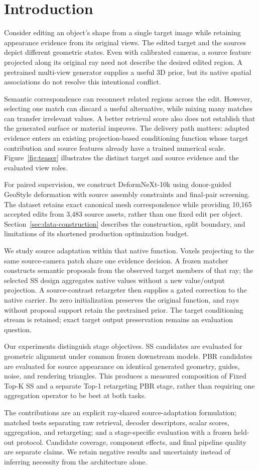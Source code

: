 \section{Introduction}
Consider editing an object's shape from a single target image while retaining
appearance evidence from its original views. The edited target and the
sources depict different geometric states. Even with calibrated cameras, a
source feature projected along its original ray need not describe the desired
edited region. A pretrained multi-view generator supplies a useful 3D prior,
but its native spatial associations do not resolve this intentional conflict.

Semantic correspondence can reconnect related regions across the edit.
However, selecting one match can discard a useful alternative, while mixing
many matches can transfer irrelevant values. A better retrieval score also
does not establish that the generated surface or material improves. The
delivery path matters: adapted evidence enters an existing projection-based
conditioning function whose target contribution and source features already
have a trained numerical scale.
Figure~\ref{fig:teaser} illustrates the distinct target and source evidence
and the evaluated view roles.

For paired supervision, we construct DeformNeXt-10k using donor-guided
GeoStyle deformation with source assembly constraints and final-pair
screening. The dataset retains exact canonical mesh correspondence while
providing 10,165 accepted edits from 3,483 source assets, rather than one
fixed edit per object. Section~\ref{sec:data-construction} describes the
construction, split boundary, and limitations of its shortened production
optimization budget.

We study source adaptation within that native function. Voxels projecting to
the same source-camera patch share one evidence decision. A frozen matcher
constructs semantic proposals from the observed target members of that ray;
the selected SS design aggregates native values without a new value/output
projection. A source-contrast retargeter then supplies a gated correction to
the native carrier. Its zero initialization preserves the original function,
and rays without proposal support retain the pretrained prior. The target
conditioning stream is retained; exact target output preservation remains
an evaluation question.

Our experiments distinguish stage objectives. SS candidates are evaluated
for geometric alignment under common frozen downstream models. PBR
candidates are evaluated for source appearance on identical generated
geometry, guides, noise, and rendering triangles. This produces a measured
composition of Fixed Top-K SS and a separate Top-1 retargeting PBR stage,
rather than requiring one aggregation operator to be best at both tasks.

The contributions are an explicit ray-shared source-adaptation formulation;
matched tests separating raw retrieval, decoder descriptors, scalar scores,
aggregation, and retargeting; and a stage-specific evaluation with a frozen
held-out protocol. Candidate coverage, component effects, and final pipeline
quality are separate claims. We retain negative results and uncertainty
instead of inferring necessity from the architecture alone.
